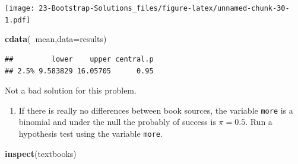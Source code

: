 \documentclass[
]{book}
\newenvironment{Shaded}{\begin{snugshade}}{\end{snugshade}}
\newcommand{\DataTypeTok}[1]{\textcolor[rgb]{0.13,0.29,0.53}{#1}}
\newcommand{\DecValTok}[1]{\textcolor[rgb]{0.00,0.00,0.81}{#1}}
\newcommand{\FloatTok}[1]{\textcolor[rgb]{0.00,0.00,0.81}{#1}}
\newcommand{\KeywordTok}[1]{\textcolor[rgb]{0.13,0.29,0.53}{\textbf{#1}}}
\newcommand{\NormalTok}[1]{#1}
\newcommand{\OperatorTok}[1]{\textcolor[rgb]{0.81,0.36,0.00}{\textbf{#1}}}
\newcommand{\StringTok}[1]{\textcolor[rgb]{0.31,0.60,0.02}{#1}}
\providecommand{\tightlist}{%
  \setlength{\itemsep}{0pt}\setlength{\parskip}{0pt}}
\begin{document}
\begin{Shaded}
\end{Shaded}

\texttt{[image: 23-Bootstrap-Solutions\_files/figure-latex/unnamed-chunk-30-1.pdf]}

\begin{Shaded}
\begin{Highlighting}[]
\KeywordTok{cdata}\NormalTok{(}\OperatorTok{~}\NormalTok{mean,}\DataTypeTok{data=}\NormalTok{results)}
\end{Highlighting}
\end{Shaded}

\begin{verbatim}
##         lower    upper central.p
## 2.5% 9.583829 16.05705      0.95
\end{verbatim}

Not a bad solution for this problem.

\begin{enumerate}
\def\labelenumi{\alph{enumi}.}
\setcounter{enumi}{6}
\tightlist
\item
  If there is really no differences between book sources, the variable \texttt{more} is a binomial and under the null the probably of success is \(\pi = 0.5\). Run a hypothesis test using the variable \texttt{more}.
\end{enumerate}

\begin{Shaded}
\begin{Highlighting}[]
\KeywordTok{inspect}\NormalTok{(textbooks)}
\end{Highlighting}
\end{Shaded}
\end{document}
